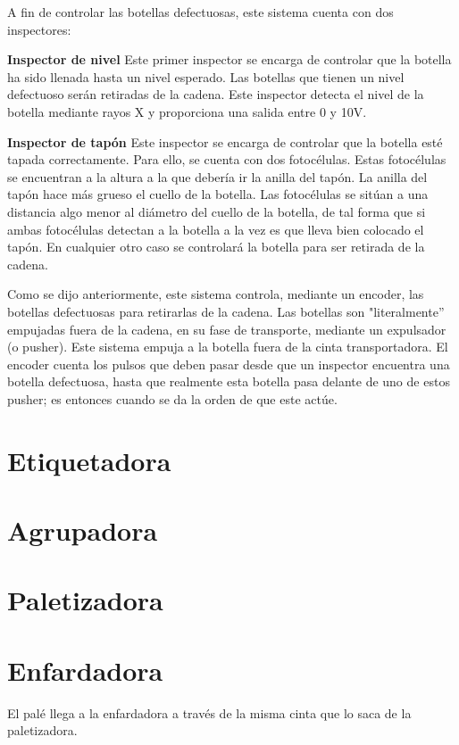 \documentclass[11pt,a4paper,spanish,twoside]{report}
\begin{document}
A fin de controlar las botellas defectuosas, este sistema cuenta con dos 
inspectores:
\begin{description}
\item \textbf{Inspector de nivel}
Este primer inspector se encarga de controlar que la botella ha sido llenada 
hasta un nivel esperado. Las botellas que tienen un nivel defectuoso serán 
retiradas de la cadena. Este inspector detecta el nivel de la botella mediante 
rayos X y proporciona una salida entre 0 y 10V.

\item \textbf{Inspector de tapón}
Este inspector se encarga de controlar que la botella esté tapada 
correctamente. Para ello, se cuenta con dos fotocélulas. Estas fotocélulas se 
encuentran a la altura a la que debería ir la anilla del tapón. La anilla del 
tapón hace más grueso el cuello de la botella. Las fotocélulas se sitúan a una 
distancia algo menor al diámetro del cuello de la botella, de tal forma que si
ambas fotocélulas detectan a la botella a la vez es que lleva bien colocado el 
tapón. En cualquier otro caso se controlará la botella para ser retirada  de la
cadena.
\end{description}

Como se dijo anteriormente, este sistema controla, mediante un encoder, las 
botellas defectuosas para retirarlas de la cadena. Las botellas son 
"literalmente'' empujadas fuera de la cadena, en su fase de transporte, 
mediante un expulsador (o pusher). Este sistema empuja a la botella fuera de 
la cinta transportadora. El encoder cuenta los pulsos que deben pasar desde 
que un inspector encuentra una botella defectuosa, hasta que realmente esta 
botella pasa delante de uno de estos pusher; es entonces cuando se da la orden 
de que este actúe.

\section{Etiquetadora}

\section{Agrupadora}

\section{Paletizadora}

\section{Enfardadora}
El palé llega a la enfardadora a través de la misma cinta que lo saca de la 
paletizadora. 
\end{document}
